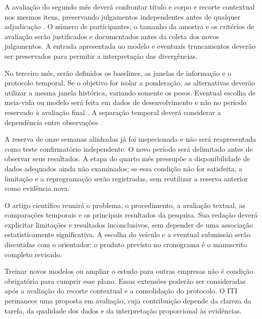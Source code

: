 A avaliação do segundo mês deverá confrontar título e corpo e recorte contextual nos mesmos itens, preservando julgamentos independentes antes de qualquer adjudicação \cite{artstein2008agreement}. O número de participantes, o tamanho da amostra e os critérios de avaliação serão justificados e documentados antes da coleta dos novos julgamentos. A entrada apresentada ao modelo e eventuais truncamentos deverão ser preservados para permitir a interpretação das divergências.

No terceiro mês, serão definidos os baselines, as janelas de informação e o protocolo temporal. Se o objetivo for isolar a ponderação, as alternativas deverão utilizar a mesma janela histórica, variando somente os pesos. Eventual escolha de meia-vida ou modelo será feita em dados de desenvolvimento e não no período reservado à avaliação final \cite{varma2006bias}. A separação temporal deverá considerar a dependência entre observações \cite{roberts2017cross}.

A reserva de onze semanas alinhadas já foi inspecionada e não será reapresentada como teste confirmatório independente. O novo período será delimitado antes de observar seus resultados. A etapa do quarto mês pressupõe a disponibilidade de dados adequados ainda não examinados; se essa condição não for satisfeita, a limitação e a reprogramação serão registradas, sem reutilizar a reserva anterior como evidência nova.

O artigo científico reunirá o problema, o procedimento, a avaliação textual, as comparações temporais e os principais resultados da pesquisa. Sua redação deverá explicitar limitações e resultados inconclusivos, sem depender de uma associação estatisticamente significativa. A escolha do veículo e a eventual submissão serão discutidas com o orientador; o produto previsto no cronograma é o manuscrito completo revisado.

Treinar novos modelos ou ampliar o estudo para outras empresas não é condição obrigatória para cumprir esse plano. Essas extensões poderão ser consideradas após a avaliação do recorte contextual e a consolidação do protocolo. O ITI permanece uma proposta em avaliação, cuja contribuição depende da clareza da tarefa, da qualidade dos dados e da interpretação proporcional às evidências.
